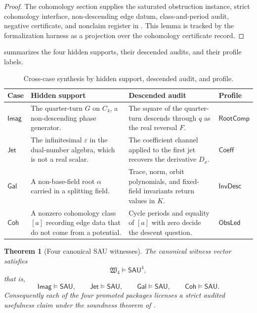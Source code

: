 \documentclass[11pt]{article}
\newcommand{\SAU}{\mathsf{SAU}}
\newcommand{\Imag}{\mathsf{Imag}}
\newcommand{\Jet}{\mathsf{Jet}}
\newcommand{\Galois}{\mathsf{Gal}}
\newcommand{\Coh}{\mathsf{Coh}}
\newcommand{\RootComp}{\mathsf{RootComp}}
\newcommand{\Coeff}{\mathsf{Coeff}}
\newcommand{\InvDesc}{\mathsf{InvDesc}}
\newcommand{\ObsLed}{\mathsf{ObsLed}}
\newtheorem{theorem}{Theorem}[section]
\theoremstyle{definition}
\begin{document}
\begin{proof}
The cohomology section supplies the saturated obstruction instance, strict
cohomology interface, non-descending edge datum, class-and-period audit,
negative certificate, and nonclaim register in .  This
lemma is tracked by the formalization harness as a projection over the
cohomology certificate record.
\end{proof}

 summarizes the four hidden supports, their
descended audits, and their profile labels.

\begingroup\begin{table}[tbp]
\centering
\footnotesize
\caption{Cross-case synthesis by hidden support, descended audit, and profile.}
\label{tab:cross-case-synthesis}
\begin{tabularx}{\textwidth}{@{}>{\raggedright\arraybackslash}p{}X X >{\raggedright\arraybackslash}p{}@{}}
\toprule
Case & Hidden support & Descended audit & Profile \\
\midrule
\(\Imag\) &
The quarter-turn \(G\) on \(C_4\), a non-descending phase generator. &
The square of the quarter-turn descends through \(q\) as the real reversal \(F\). &
\(\RootComp\) \\
\(\Jet\) &
The infinitesimal \(\varepsilon\) in the dual-number algebra, which is not a real scalar. &
The coefficient channel applied to the first jet recovers the derivative \(D_x\). &
\(\Coeff\) \\
\(\Galois\) &
A non-base-field root \(\alpha\) carried in a splitting field. &
Trace, norm, orbit polynomials, and fixed-field invariants return values in \(K\). &
\(\InvDesc\) \\
\(\Coh\) &
A nonzero cohomology class \([a]\) recording edge data that do not come from a potential. &
Cycle periods and equality of \([a]\) with zero decide the descent question. &
\(\ObsLed\) \\
\bottomrule
\end{tabularx}
\end{table}
 \endgroup

\begin{theorem}[Four canonical SAU witnesses]
\label{thm:sau-four-canonical-witnesses}
The canonical witness vector satisfies
\[
\mathfrak W_4\models\SAU^4,
\]
that is,
\[
\Imag\models\SAU,
\qquad
\Jet\models\SAU,
\qquad
\Galois\models\SAU,
\qquad
\Coh\models\SAU.
\]
Consequently each of the four promoted packages licenses a strict audited usefulness claim under the soundness theorem of .
\end{theorem}
\end{document}
